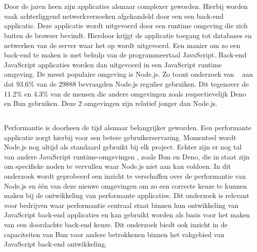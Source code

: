 
\chapter{}%
\label{ch:inleiding}


Door de jaren heen zijn applicaties alsmaar complexer geworden. Hierbij worden vaak achterliggend netwerkverzoeken afgehandeld door een 
een back-end applicatie. Deze applicatie wordt uitgevoerd door een runtime omgeving die zich buiten de browser bevindt.
Hierdoor krijgt de applicatie toegang tot databases en netwerken van de server waar het op wordt uitgevoerd.
Een manier om zo een back-end te maken is met behulp van de programmeertaal JavaScript. 
Back-end JavaScript applicaties worden dan uitgevoerd in een JavaScript runtime omgeving.
De meest populaire omgeving is Node.js. Zo toont onderzoek van ~\textcite{Greif2022} aan dat 93.6\% van de 29888 bevraagden Node.js 
regulier gebruiken.
Dit tegenover de 11.2\% en 4.3\% van de mensen die andere omgevingen zoals respectievelijk Deno en Bun gebruiken.
Deze 2 omgevingen zijn relatief jonger dan Node.js.

\section{}%
\label{sec:probleemstelling}

Performantie is doorheen de tijd alsmaar belangrijker geworden. 
Een performante applicatie zorgt hierbij voor een betere gebruikerservaring. 
Momenteel wordt Node.js nog altijd als standaard gebruikt bij elk project. Echter zijn er nog tal van andere JavaScript runtime-omgevingen
, zoals Bun en Deno, die in staat zijn om specifieke noden te vervullen waar Node.js niet aan kan voldoen. In dit onderzoek wordt geprobeerd 
een inzicht te verschaffen over de performantie van Node.js en één van deze nieuwe omgevingen
om zo een correcte keuze te kunnen maken bij de ontwikkeling van performante applicaties.
Dit onderzoek is relevant voor bedrijven waar performantie centraal staat binnen hun ontwikkeling van JavaScript back-end applicaties en kan gebruikt worden als basis 
voor het maken van een doordachte back-end keuze. Dit onderzoek 
biedt ook inzicht in de capaciteiten van Bun voor andere betrokkenen binnen het vakgebied van JavaScript back-end ontwikkeling.

